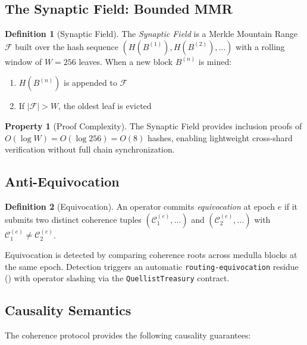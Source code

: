 \documentclass[11pt,twocolumn]{article}
\theoremstyle{definition}
\newtheorem{definition}{Definition}[section]
\newtheorem{property}{Property}[section]
\theoremstyle{plain}
\theoremstyle{remark}
\begin{document}
\subsection{The Synaptic Field: Bounded MMR}

\begin{definition}[Synaptic Field]\label{def:synaptic-field}
The \emph{Synaptic Field} is a Merkle Mountain Range~\cite{todd2012mmr} $\mathcal{F}$ built over the hash sequence $(H(B^{(1)}), H(B^{(2)}), \ldots)$ with a rolling window of $W = 256$ leaves. When a new block $B^{(n)}$ is mined:
\begin{enumerate}[leftmargin=*,itemsep=1pt]
  \item $H(B^{(n)})$ is appended to $\mathcal{F}$
  \item If $|\mathcal{F}| > W$, the oldest leaf is evicted
\end{enumerate}
\end{definition}

\begin{property}[Proof Complexity]
The Synaptic Field provides inclusion proofs of $O(\log W) = O(\log 256) = O(8)$ hashes, enabling lightweight cross-shard verification without full chain synchronization.
\end{property}

\subsection{Anti-Equivocation}

\begin{definition}[Equivocation]
An operator commits \emph{equivocation} at epoch $e$ if it submits two distinct coherence tuples $(\mathcal{C}^{(e)}_1, \ldots)$ and $(\mathcal{C}^{(e)}_2, \ldots)$ with $\mathcal{C}^{(e)}_1 \neq \mathcal{C}^{(e)}_2$.
\end{definition}

Equivocation is detected by comparing coherence roots across medulla blocks at the same epoch. Detection triggers an automatic \texttt{routing-equivocation} residue () with operator slashing via the \texttt{QuellistTreasury} contract.

\subsection{Causality Semantics}

The coherence protocol provides the following causality guarantees:
\end{document}
